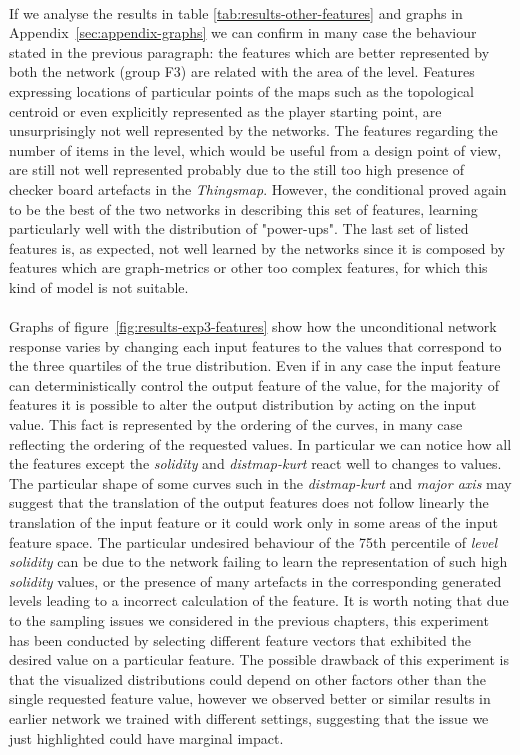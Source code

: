 \paragraph{} If we analyse the results in table \ref{tab:results-other-features} and graphs in Appendix~\ref{sec:appendix-graphs} we can confirm in many case the behaviour stated in the previous paragraph: the features which are better represented by both the network (group F3) are related with the area of the level. Features expressing  locations of particular points of the maps such as the topological centroid or even explicitly represented as the player starting point, are unsurprisingly not well represented by the networks. The features regarding the number of items in the level, which would be useful from a design point of view, are still not well represented probably due to the still too high presence of checker board artefacts in the \textit{Thingsmap}. However, the conditional proved again to be the best of the two networks in describing this set of features, learning particularly well with the distribution of "power-ups". The last set of listed features is, as expected, not well learned by the networks since it is composed by features which are graph-metrics or other too complex features, for which this kind of model is not suitable.

\paragraph{} Graphs of figure~\ref{fig:results-exp3-features} show how the unconditional network response varies by changing each input features to the values that correspond to the three quartiles of the true distribution. Even if in any case the input feature can deterministically control the output feature of the value, for the majority of features it is possible to alter the output distribution by acting on the input value. This fact is represented by the ordering of the curves, in many case reflecting the ordering of the requested values.
In particular we can notice how all the features except the \textit{solidity} and \textit{distmap-kurt} react well to changes to values. The particular shape of some curves such in the \textit{distmap-kurt} and \textit{major axis} may suggest that the translation of the output features does not follow linearly the translation of the input feature or it could work only in some areas of the input feature space. The particular undesired behaviour of the 75th percentile of \textit{level solidity} can be due to the network failing to learn the representation of such high \textit{solidity} values, or the presence of many artefacts in the corresponding generated levels leading to a incorrect calculation of the feature. 
 It is worth noting that due to the sampling issues we considered in the previous chapters, this experiment has been conducted by selecting different feature vectors that exhibited the desired value on a particular feature. The possible drawback of this experiment is that the visualized distributions could depend on other factors other than the single requested feature value, however we observed better or similar results in earlier network we trained with different settings, suggesting that the issue we just highlighted could have marginal impact.

